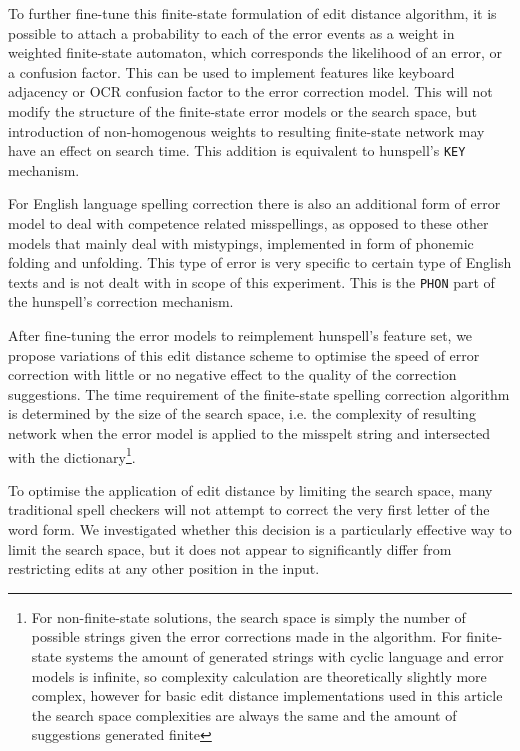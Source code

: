 \documentclass[11pt]{article}
\begin{document}
To further fine-tune this finite-state formulation of edit distance algorithm,
it is possible to attach a probability to each of the error events as a weight
in weighted finite-state automaton, which corresponds the likelihood of an error,
or a confusion factor. This can be used to implement features like keyboard
adjacency or OCR confusion factor to the error correction model. This will not
modify the structure of the finite-state error models or the search space, but
introduction of non-homogenous weights to resulting finite-state network may
have an effect on search time. This addition is equivalent to hunspell's
\texttt{KEY} mechanism.

For English language spelling correction there is also an additional form of
error model to deal with competence related misspellings, as opposed to these
other models that mainly deal with mistypings, implemented in form of phonemic
folding and unfolding. This type of error is very specific to certain type of
English texts and is not dealt with in scope of this experiment. This is
the \texttt{PHON} part of the hunspell's correction mechanism.

After fine-tuning the error models to reimplement hunspell's feature set, we
propose variations of this edit distance scheme to optimise the
speed of error correction with little or no negative effect to the quality of
the correction suggestions. The time requirement of the
finite-state spelling correction algorithm is determined by the size of the
search space,
i.e. the complexity of resulting network when the error model is applied to the
misspelt string and intersected with the dictionary\footnote{For non-finite-state
solutions, the search space is simply the number of
possible strings given the error corrections made in the algorithm. For
finite-state systems the amount of generated strings with cyclic language and
error models is infinite, so complexity calculation are theoretically slightly
more complex, however for basic edit distance implementations used in this
article the search space complexities are always the same and the amount of
suggestions generated finite}.

To optimise the application of edit distance by limiting the search space, many
traditional spell checkers will not attempt to correct the very first letter of
the word form. We investigated whether this decision is a particularly
effective way to limit the search space, but it does not appear to
significantly differ from restricting edits at any other position in the input.
\end{document}
